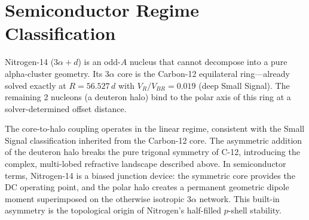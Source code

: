 \section{Semiconductor Regime Classification}
Nitrogen-14 ($3\alpha + d$) is an odd-$A$ nucleus that cannot decompose into a pure alpha-cluster geometry. Its $3\alpha$ core is the Carbon-12 equilateral ring---already solved exactly at $R = 56.527\,d$ with $V_R/V_{BR} = 0.019$ (deep Small Signal). The remaining 2 nucleons (a deuteron halo) bind to the polar axis of this ring at a solver-determined offset distance.

The core-to-halo coupling operates in the linear regime, consistent with the Small Signal classification inherited from the Carbon-12 core. The asymmetric addition of the deuteron halo breaks the pure trigonal symmetry of C-12, introducing the complex, multi-lobed refractive landscape described above. In semiconductor terms, Nitrogen-14 is a biased junction device: the symmetric core provides the DC operating point, and the polar halo creates a permanent geometric dipole moment superimposed on the otherwise isotropic $3\alpha$ network. This built-in asymmetry is the topological origin of Nitrogen's half-filled $p$-shell stability.

